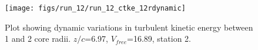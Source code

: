 \begin{figure}[H]
\centering
\texttt{[image: figs/run\_12/run\_12\_ctke\_12rdynamic]}
\caption{Plot showing dynamic variations in turbulent kinetic energy between 1 and 2 core radii. $z/c$=6.97, $V_{free}$=16.89, station 2.}
\label{fig:run_12_ctke_12rdynamic}
\end{figure}


